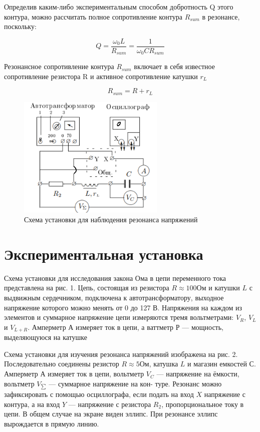 Определив каким-либо экспериментальным способом добротность Q этого контура, можно рассчитать полное сопротивление контура $R_{sum}$ в резонансе, поскольку:

\begin{equation}\label{}
Q = \frac{\omega_0 L}{R_{sum}} = \frac{1}{\omega_0 C R_{sum}}
\end{equation}

Резонансное сопротивление контура $R_{sum}$ включает в себя известное сопротивление резистора R и активное сопротивление катушки $r_L$

\begin{equation}\label{}
R_{sum} = R + r_L
\end{equation}

\begin{figure}[h]
	\includegraphics[width= 7cm]{pics/Pic2.png}
	\caption{Схема установки для наблюдения резонанса напряжений}
	\label{Pic2}
\end{figure}





\section{Экспериментальная установка}
Схема установки для исследования
закона Ома в цепи переменного тока представлена на рис. 1. Цепь, состоящая из резистора $R \approx 100 Ом$ и катушки $L$ с выдвижным сердечником, подключена к автотрансформатору, выходное напряжение которого можно менять от 0 до 127 В. Напряжения на каждом из элементов
и суммарное напряжение цепи измеряются тремя вольтметрами: $V_R$, $V_L$ и $V_{L+R}$. Амперметр $А$ измеряет ток в цепи, а ваттметр $Р$ — мощность,
выделяющуюся на катушке

Схема установки для изучения резонанса напряжений изображена
на рис. 2. Последовательно соединены резистор $R \approx 5 Ом$, катушка $L$ и
магазин емкостей $С$. Амперметр $А$ измеряет ток в цепи, вольтметр $V_C$ —
напряжение на ёмкости, вольтметр $V_{\sum}$ — суммарное напряжение на кон-
туре. Резонанс можно зафиксировать с помощью осциллографа, если
подать на вход $X$ напряжение с контура, а на вход $Y$ — напряжение с
резистора $R_2$, пропорциональное току в цепи. В общем случае на экране
виден эллипс. При резонансе эллипс вырождается в прямую линию.

